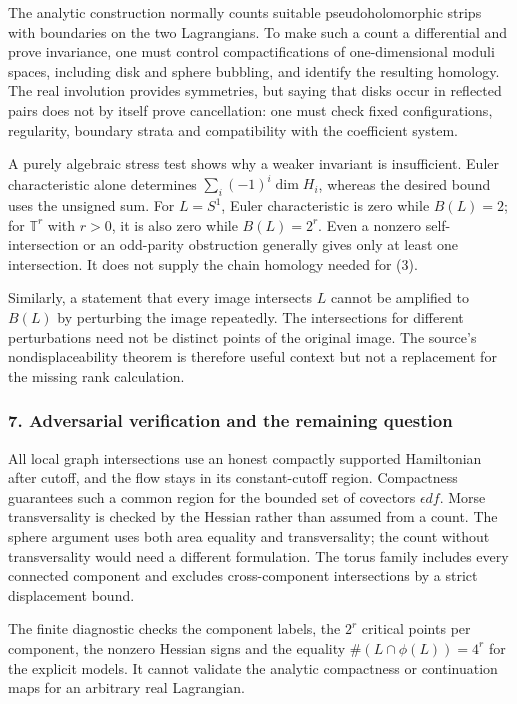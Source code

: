 \documentclass[11pt]{article}
\begin{document}
The analytic construction normally counts suitable pseudoholomorphic strips with boundaries on the two Lagrangians. To make such a count a differential and prove invariance, one must control compactifications of one-dimensional moduli spaces, including disk and sphere bubbling, and identify the resulting homology. The real involution provides symmetries, but saying that disks occur in reflected pairs does not by itself prove cancellation: one must check fixed configurations, regularity, boundary strata and compatibility with the coefficient system.

A purely algebraic stress test shows why a weaker invariant is insufficient. Euler characteristic alone determines
$\sum_i(-1)^i\dim H_i$, whereas the desired bound uses the unsigned sum. For $L=S^1$, Euler characteristic is zero while $B(L)=2$; for $\mathbb T^r$ with $r>0$, it is also zero while $B(L)=2^r$. Even a nonzero self-intersection or an odd-parity obstruction generally gives only at least one intersection. It does not supply the chain homology needed for (3).

Similarly, a statement that every image intersects $L$ cannot be amplified to $B(L)$ by perturbing the image repeatedly. The intersections for different perturbations need not be distinct points of the original image. The source's nondisplaceability theorem is therefore useful context but not a replacement for the missing rank calculation.

\subsubsection{7. Adversarial verification and the remaining question}
All local graph intersections use an honest compactly supported Hamiltonian after cutoff, and the flow stays in its constant-cutoff region. Compactness guarantees such a common region for the bounded set of covectors $\epsilon df$. Morse transversality is checked by the Hessian rather than assumed from a count. The sphere argument uses both area equality and transversality; the count without transversality would need a different formulation. The torus family includes every connected component and excludes cross-component intersections by a strict displacement bound.

The finite diagnostic checks the component labels, the $2^r$ critical points per component, the nonzero Hessian signs and the equality $\#(L\cap\phi(L))=4^r$ for the explicit models. It cannot validate the analytic compactness or continuation maps for an arbitrary real Lagrangian.
\end{document}
